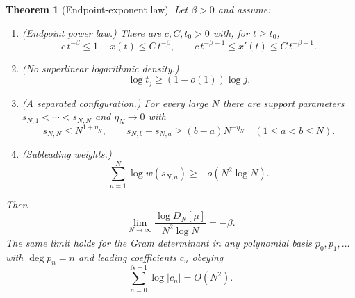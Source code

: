 \documentclass[11pt]{amsart}
\numberwithin{equation}{section}
\theoremstyle{plain}
\newtheorem{theorem}{Theorem}[section]
\theoremstyle{definition}
\theoremstyle{remark}
\begin{document}
\begin{theorem}[Endpoint-exponent law]
\label{thm:endpoint}
Let $\beta>0$ and assume:
\begin{enumerate}[label=\textup{(\roman*)}]
\item \textup{(Endpoint power law.)} There are $c,C,t_{0}>0$ with, for $t\ge t_{0}$,
\begin{equation}
c\,t^{-\beta}\le1-x(t)\le C\,t^{-\beta},\qquad c\,t^{-\beta-1}\le x'(t)\le C\,t^{-\beta-1}.
\label{eq:power_law}
\end{equation}
\item \textup{(No superlinear logarithmic density.)}
\begin{equation}
\log t_{j}\ge(1-o(1))\log j .
\label{eq:node_scale}
\end{equation}
\item \textup{(A separated configuration.)} For every large $N$ there are support parameters
$s_{N,1}<\cdots<s_{N,N}$ and $\eta_{N}\to0$ with
\begin{equation}
s_{N,N}\le N^{1+\eta_{N}},\qquad s_{N,b}-s_{N,a}\ge(b-a)N^{-\eta_{N}}\quad(1\le a<b\le N).
\label{eq:separated}
\end{equation}
\item \textup{(Subleading weights.)}
\begin{equation}
\sum_{a=1}^{N}\log w(s_{N,a})\ge-o(N^{2}\log N).
\label{eq:weights}
\end{equation}
\end{enumerate}
Then
\begin{equation}
\boxed{\ \lim_{N\to\infty}\frac{\log D_{N}[\mu]}{N^{2}\log N}=-\beta.\ }
\label{eq:limit}
\end{equation}
The same limit holds for the Gram determinant in any polynomial basis $p_{0},p_{1},\dots$ with
$\deg p_{n}=n$ and leading coefficients $c_{n}$ obeying
\begin{equation}
\sum_{n=0}^{N-1}\log|c_{n}|=O(N^{2}).
\label{eq:basis}
\end{equation}
\end{theorem}
\end{document}
